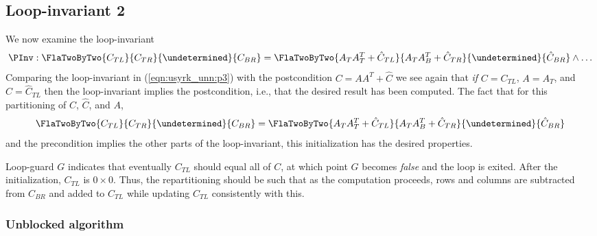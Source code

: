 \subsection{Loop-invariant 2}

We now examine the loop-invariant
\begin{equation}
\label{eqn:usyrk_unn:p3}
\PInv: 
\FlaTwoByTwo{ C_{TL} }        { C_{TR} } 
            { \undetermined } { C_{BR} }
=
\FlaTwoByTwo{ A_{T} A_{T}^T + \hat{C}_{TL} } { A_{T} A_{B}^T + \hat{C}_{TR} }
            { \undetermined }                { \hat{C}_{BR} }
\wedge
\ldots
\end{equation}
Comparing the loop-invariant in (\ref{eqn:usyrk_unn:p3}) with the
postcondition $ C = A A^T + \hat{C} $ we see again that {\em if} $C = C_{TL}$,
$ A = A_T $, and $ \hat{C} = \hat{C}_{TL} $ then the loop-invariant
implies the postcondition, i.e., that the desired result has been
computed.
%
The fact that for this partitioning of $ C $, $ \hat{C} $, and $ A $,
\[
\FlaTwoByTwo{ C_{TL} }        { C_{TR} } 
            { \undetermined } { C_{BR} }
=
\FlaTwoByTwo{ A_{T} A_{T}^T + \hat{C}_{TL} } { A_{T} A_{B}^T + \hat{C}_{TR} }
            { \undetermined }                { \hat{C}_{BR} }
\]
and the precondition implies the other parts of
the loop-invariant, this initialization has
the desired properties.

Loop-guard $ G $ indicates that eventually $ C_{TL} $ should equal all
of $ C $, at which point $ G $ becomes {\em false} and the loop is
exited.  After the initialization, $ C_{TL} $ is $ 0 \times 0 $.
Thus, the repartitioning should be such that as the computation
proceeds, rows and columns are subtracted from $ C_{BR} $ and added to
$ C_{TL} $ while updating $ C_{TL} $ consistently with this.

%


\subsubsection{Unblocked algorithm}


